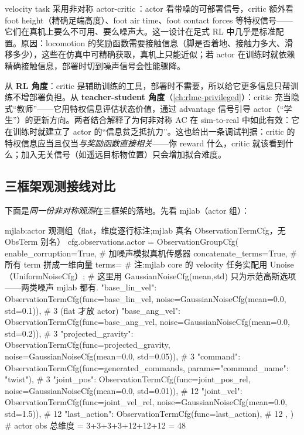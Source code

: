 velocity task 采用非对称 actor-critic\,\cite{pinto2018asymmetric}：actor 看带噪的可部署信号，critic 额外看 foot height（精确足端高度）、foot air time、foot contact forces 等特权信号——它们在真机上要么不可用、要么噪声大。这一设计在足式 RL 中几乎是标准配置。原因：locomotion 的奖励函数需要接触信息（脚是否着地、接触力多大、滑移多少），这些在仿真中可精确获取，真机上只能近似；若 actor 在训练时就依赖精确接触信息，部署时切到噪声信号会性能骤降。

\begin{insight}\label{ins:rlmc-ql-asym}
从 \textbf{RL 角度}：critic 是辅助训练的工具，部署时不需要，所以给它更多信息只帮训练不增部署负担。从 \textbf{teacher-student 角度}（\cref{ch:rlmc-privileged}）：critic 充当隐式“教师”——它用特权信息评估状态价值，通过 advantage 信号引导 actor（“学生”）的更新方向。两者结合解释了为何非对称 AC 在 sim-to-real 中如此有效：它在训练时就建立了 actor 的“信息贫乏抵抗力”。这也给出一条调试判据：critic 的特权信息应当且仅当\emph{与奖励函数直接相关}——你 reward 什么，critic 就该看到什么；加入无关信号（如遥远目标物位置）只会增加拟合难度。
\end{insight}

\subsection{三框架观测接线对比}
\label{sec:rlmc-ql-obs-config}

下面是\emph{同一份非对称观测}在三框架的落地。先看 mjlab（actor 组）：

\begin{codebox}[Python]{mjlab:actor 观测组（flat，维度逐行标注;mjlab 真名 ObservationTermCfg，无 ObsTerm 别名）}
cfg.observations.actor = ObservationGroupCfg(
    enable_corruption=True,    # 加噪声模拟真机传感器
    concatenate_terms=True,    # 所有 term 拼成一维向量
    terms={
        # 注:mjlab core 的 velocity 任务实配用 Unoise（UniformNoiseCfg）;
        #     这里用 GaussianNoiseCfg(mean,std) 只为示范高斯选项——两类噪声 mjlab 都有.
        "base_lin_vel":      ObservationTermCfg(func=base_lin_vel,
                                     noise=GaussianNoiseCfg(mean=0.0, std=0.1)),   # 3 (flat 才放 actor)
        "base_ang_vel":      ObservationTermCfg(func=base_ang_vel,
                                     noise=GaussianNoiseCfg(mean=0.0, std=0.2)),   # 3
        "projected_gravity": ObservationTermCfg(func=projected_gravity,
                                     noise=GaussianNoiseCfg(mean=0.0, std=0.05)),  # 3
        "command":           ObservationTermCfg(func=generated_commands,
                                     params={"command_name": "twist"}),            # 3
        "joint_pos":         ObservationTermCfg(func=joint_pos_rel,
                                     noise=GaussianNoiseCfg(mean=0.0, std=0.01)),  # 12
        "joint_vel":         ObservationTermCfg(func=joint_vel_rel,
                                     noise=GaussianNoiseCfg(mean=0.0, std=1.5)),   # 12
        "last_action":       ObservationTermCfg(func=last_action),                 # 12
    },
)   # actor obs 总维度 = 3+3+3+3+12+12+12 = 48
\end{codebox}

